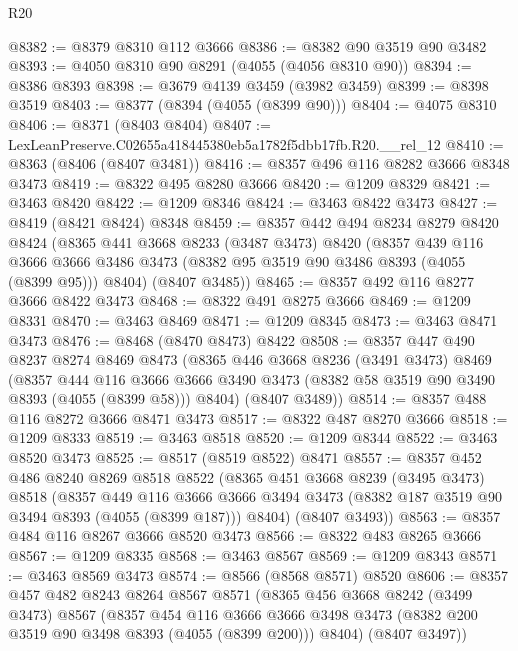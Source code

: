 \begin{lexlean}{R20}
\begin{coremodule}
@8382 := @8379 @8310 @112 @3666
@8386 := @8382 @90 @3519 @90 @3482
@8393 := @4050 @8310 @90 @8291 (@4055 (@4056 @8310 @90))
@8394 := @8386 @8393
@8398 := @3679 @4139 @3459 (@3982 @3459)
@8399 := @8398 @3519
@8403 := @8377 (@8394 (@4055 (@8399 @90)))
@8404 := @4075 @8310
@8406 := @8371 (@8403 @8404)
@8407 := LexLeanPreserve.C02655a418445380eb5a1782f5dbb17fb.R20.__rel_12
@8410 := @8363 (@8406 (@8407 @3481))
@8416 := @8357 @496 @116 @8282 @3666 @8348 @3473
@8419 := @8322 @495 @8280 @3666
@8420 := @1209 @8329
@8421 := @3463 @8420
@8422 := @1209 @8346
@8424 := @3463 @8422 @3473
@8427 := @8419 (@8421 @8424) @8348
@8459 := @8357
    @442
    @494
    @8234
    @8279
    @8420
    @8424
    (@8365
      @441
      @3668
      @8233
      (@3487 @3473)
      @8420
      (@8357
        @439
        @116
        @3666
        @3666
        @3486
        @3473
        (@8382 @95 @3519 @90 @3486 @8393 (@4055 (@8399 @95)))
        @8404)
      (@8407 @3485))
@8465 := @8357 @492 @116 @8277 @3666 @8422 @3473
@8468 := @8322 @491 @8275 @3666
@8469 := @1209 @8331
@8470 := @3463 @8469
@8471 := @1209 @8345
@8473 := @3463 @8471 @3473
@8476 := @8468 (@8470 @8473) @8422
@8508 := @8357
    @447
    @490
    @8237
    @8274
    @8469
    @8473
    (@8365
      @446
      @3668
      @8236
      (@3491 @3473)
      @8469
      (@8357
        @444
        @116
        @3666
        @3666
        @3490
        @3473
        (@8382 @58 @3519 @90 @3490 @8393 (@4055 (@8399 @58)))
        @8404)
      (@8407 @3489))
@8514 := @8357 @488 @116 @8272 @3666 @8471 @3473
@8517 := @8322 @487 @8270 @3666
@8518 := @1209 @8333
@8519 := @3463 @8518
@8520 := @1209 @8344
@8522 := @3463 @8520 @3473
@8525 := @8517 (@8519 @8522) @8471
@8557 := @8357
    @452
    @486
    @8240
    @8269
    @8518
    @8522
    (@8365
      @451
      @3668
      @8239
      (@3495 @3473)
      @8518
      (@8357
        @449
        @116
        @3666
        @3666
        @3494
        @3473
        (@8382 @187 @3519 @90 @3494 @8393 (@4055 (@8399 @187)))
        @8404)
      (@8407 @3493))
@8563 := @8357 @484 @116 @8267 @3666 @8520 @3473
@8566 := @8322 @483 @8265 @3666
@8567 := @1209 @8335
@8568 := @3463 @8567
@8569 := @1209 @8343
@8571 := @3463 @8569 @3473
@8574 := @8566 (@8568 @8571) @8520
@8606 := @8357
    @457
    @482
    @8243
    @8264
    @8567
    @8571
    (@8365
      @456
      @3668
      @8242
      (@3499 @3473)
      @8567
      (@8357
        @454
        @116
        @3666
        @3666
        @3498
        @3473
        (@8382 @200 @3519 @90 @3498 @8393 (@4055 (@8399 @200)))
        @8404)
      (@8407 @3497))

\end{coremodule}
\end{lexlean}
